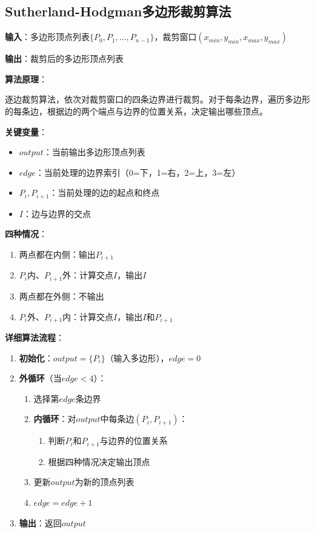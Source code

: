 \documentclass[12pt,a4paper]{article}
\begin{document}
\clearpage

\begin{tcolorbox}
\subsection{Sutherland-Hodgman多边形裁剪算法}

\textbf{输入}：多边形顶点列表$\{P_0, P_1, \ldots, P_{n-1}\}$，裁剪窗口$(x_{min}, y_{min}, x_{max}, y_{max})$

\textbf{输出}：裁剪后的多边形顶点列表

\textbf{算法原理}：

逐边裁剪算法，依次对裁剪窗口的四条边界进行裁剪。对于每条边界，遍历多边形的每条边，根据边的两个端点与边界的位置关系，决定输出哪些顶点。

\textbf{关键变量}：
\begin{itemize}
    \item $output$：当前输出多边形顶点列表
    \item $edge$：当前处理的边界索引（0=下，1=右，2=上，3=左）
    \item $P_i, P_{i+1}$：当前处理的边的起点和终点
    \item $I$：边与边界的交点
\end{itemize}

\textbf{四种情况}：
\begin{enumerate}
    \item 两点都在内侧：输出$P_{i+1}$
    \item $P_i$内、$P_{i+1}$外：计算交点$I$，输出$I$
    \item 两点都在外侧：不输出
    \item $P_i$外、$P_{i+1}$内：计算交点$I$，输出$I$和$P_{i+1}$
\end{enumerate}

\textbf{详细算法流程}：
\begin{enumerate}
    \item \textbf{初始化}：$output = \{P_i\}$（输入多边形），$edge = 0$
    \item \textbf{外循环}（当$edge < 4$）：
    \begin{enumerate}
        \item 选择第$edge$条边界
        \item \textbf{内循环}：对$output$中每条边$(P_i, P_{i+1})$：
        \begin{enumerate}
            \item 判断$P_i$和$P_{i+1}$与边界的位置关系
            \item 根据四种情况决定输出顶点
        \end{enumerate}
        \item 更新$output$为新的顶点列表
        \item $edge = edge + 1$
    \end{enumerate}
    \item \textbf{输出}：返回$output$
\end{enumerate}


\end{tcolorbox}
\end{document}
